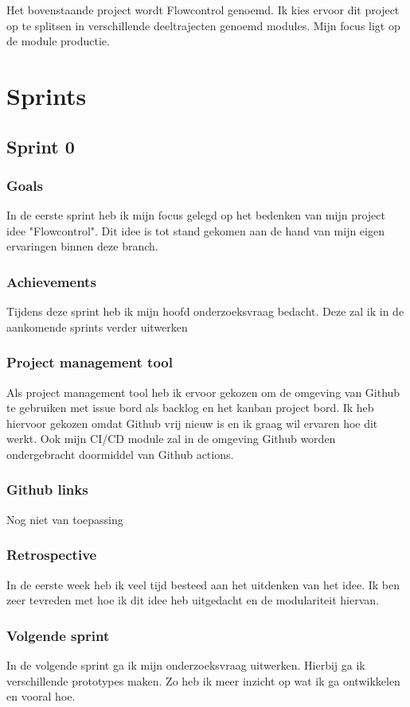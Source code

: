\documentclass[11pt, twoside]{report}
\begin{document}
    \newline

    Het bovenstaande project wordt Flowcontrol genoemd. Ik kies ervoor dit project op te splitsen in verschillende
    deeltrajecten genoemd modules. Mijn focus ligt op de module productie.

    \chapter{Sprints}\label{ch:sprints}
    \section{Sprint 0}\label{sec:sprint-0}
    \subsection{Goals}\label{subsec:goals}
    In de eerste sprint heb ik mijn focus gelegd op het bedenken van mijn project idee "Flowcontrol".
    Dit idee is tot stand gekomen aan de hand van mijn eigen ervaringen binnen deze branch.

    \subsection{Achievements}\label{subsec:achievements}
    Tijdens deze sprint heb ik mijn hoofd onderzoeksvraag bedacht. Deze zal ik in de aankomende sprints verder uitwerken

    \subsection{Project management tool}\label{subsec:project-management-tool}
    Als project management tool heb ik ervoor gekozen om de omgeving van Github te gebruiken met issue bord als
    backlog en het kanban project bord.
    Ik heb hiervoor gekozen omdat Github vrij nieuw is en ik graag wil ervaren hoe dit werkt.
    Ook mijn CI/CD module zal in de omgeving Github worden ondergebracht doormiddel van Github actions.

    \subsection{Github links}\label{subsec:github-links}
    Nog niet van toepassing

    \subsection{Retrospective}\label{subsec:retrospective}
    In de eerste week heb ik veel tijd besteed aan het uitdenken van het idee.
    Ik ben zeer tevreden met hoe ik dit idee heb uitgedacht en de modulariteit hiervan.

    \subsection{Volgende sprint}\label{subsec:volgende-sprint}
    In de volgende sprint ga ik mijn onderzoeksvraag uitwerken.
    Hierbij ga ik verschillende prototypes maken.
    Zo heb ik meer inzicht op wat ik ga ontwikkelen en vooral hoe.
\end{document}
